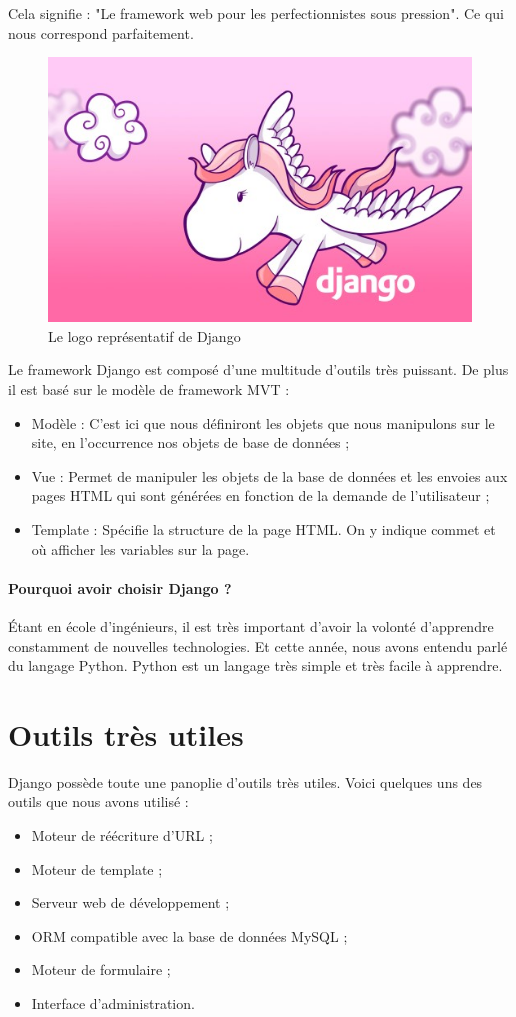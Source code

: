 \documentclass[twoside,UTF8]{EPURapport}
\begin{document}
Cela signifie : "Le framework web pour les perfectionnistes sous pression". Ce qui nous correspond parfaitement.

\begin{figure}[H]
 \centering
 \includegraphics[width=0.5\linewidth]{./logos/pony.jpg}
 \caption{Le logo représentatif de Django}
\end{figure}

Le framework Django est composé d'une multitude d'outils très puissant. De plus il est basé sur le modèle de framework MVT :
\begin{itemize}
    \item Modèle : C'est ici que nous définiront les objets que nous manipulons sur le site, en l'occurrence nos objets de base de données ;
    \item Vue : Permet de manipuler les objets de la base de données et les envoies aux pages HTML qui sont générées en fonction de la demande de l'utilisateur ;
    \item Template : Spécifie la structure de la page HTML. On y indique commet et où afficher les variables sur la page.
\end{itemize}

\paragraph{Pourquoi avoir choisir Django ?} Étant en école d'ingénieurs, il est très important d'avoir la volonté d'apprendre constamment de nouvelles technologies. Et cette année, nous avons entendu parlé du langage Python. Python est un langage très simple et très facile à apprendre.


\section{Outils très utiles}
Django possède toute une panoplie d'outils très utiles. Voici quelques uns des outils que nous avons utilisé :
\begin{itemize}
    \item Moteur de réécriture d'URL ;
    \item Moteur de template ;
    \item Serveur web de développement ;
    \item ORM compatible avec la base de données MySQL ;
    \item Moteur de formulaire ;
    \item Interface d'administration.
\end{itemize}
\end{document}
